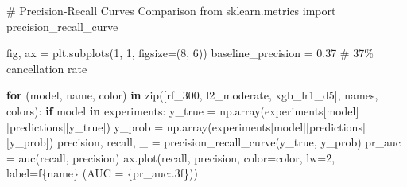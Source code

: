 \documentclass[
  letterpaper,
  DIV=11,
  numbers=noendperiod]{scrartcl}
\newenvironment{Shaded}{\begin{snugshade}}{\end{snugshade}}
\newcommand{\BuiltInTok}[1]{\textcolor[rgb]{0.00,0.23,0.31}{#1}}
\newcommand{\CommentTok}[1]{\textcolor[rgb]{0.37,0.37,0.37}{#1}}
\newcommand{\ControlFlowTok}[1]{\textcolor[rgb]{0.00,0.23,0.31}{\textbf{#1}}}
\newcommand{\DecValTok}[1]{\textcolor[rgb]{0.68,0.00,0.00}{#1}}
\newcommand{\FloatTok}[1]{\textcolor[rgb]{0.68,0.00,0.00}{#1}}
\newcommand{\ImportTok}[1]{\textcolor[rgb]{0.00,0.46,0.62}{#1}}
\newcommand{\KeywordTok}[1]{\textcolor[rgb]{0.00,0.23,0.31}{\textbf{#1}}}
\newcommand{\NormalTok}[1]{\textcolor[rgb]{0.00,0.23,0.31}{#1}}
\newcommand{\OperatorTok}[1]{\textcolor[rgb]{0.37,0.37,0.37}{#1}}
\newcommand{\SpecialCharTok}[1]{\textcolor[rgb]{0.37,0.37,0.37}{#1}}
\newcommand{\SpecialStringTok}[1]{\textcolor[rgb]{0.13,0.47,0.30}{#1}}
\newcommand{\StringTok}[1]{\textcolor[rgb]{0.13,0.47,0.30}{#1}}
\renewenvironment{Shaded}{%
  \begin{tcolorbox}[%
    enhanced,%
    colback=codebg,%
    colframe=codebg,%
    borderline west={3pt}{0pt}{sectionblue},%
    fontupper=\small\ttfamily,%
    boxrule=0pt,%
    arc=0pt,%
    boxsep=5pt,%
    left=2mm,%
    right=2mm,%
    top=2mm,%
    bottom=2mm%
  ]%
}{%
  \end{tcolorbox}%
}
\begin{document}
\begin{Shaded}
\begin{Highlighting}[]
\CommentTok{\# Precision{-}Recall Curves Comparison}
\ImportTok{from}\NormalTok{ sklearn.metrics }\ImportTok{import}\NormalTok{ precision\_recall\_curve}

\NormalTok{fig, ax }\OperatorTok{=}\NormalTok{ plt.subplots(}\DecValTok{1}\NormalTok{, }\DecValTok{1}\NormalTok{, figsize}\OperatorTok{=}\NormalTok{(}\DecValTok{8}\NormalTok{, }\DecValTok{6}\NormalTok{))}
\NormalTok{baseline\_precision }\OperatorTok{=} \FloatTok{0.37}  \CommentTok{\# 37\% cancellation rate}

\ControlFlowTok{for}\NormalTok{ (model, name, color) }\KeywordTok{in} \BuiltInTok{zip}\NormalTok{([}\StringTok{\textquotesingle{}rf\_300\textquotesingle{}}\NormalTok{, }\StringTok{\textquotesingle{}l2\_moderate\textquotesingle{}}\NormalTok{, }\StringTok{\textquotesingle{}xgb\_lr1\_d5\textquotesingle{}}\NormalTok{], names, colors):}
    \ControlFlowTok{if}\NormalTok{ model }\KeywordTok{in}\NormalTok{ experiments:}
\NormalTok{        y\_true }\OperatorTok{=}\NormalTok{ np.array(experiments[model][}\StringTok{\textquotesingle{}predictions\textquotesingle{}}\NormalTok{][}\StringTok{\textquotesingle{}y\_true\textquotesingle{}}\NormalTok{])}
\NormalTok{        y\_prob }\OperatorTok{=}\NormalTok{ np.array(experiments[model][}\StringTok{\textquotesingle{}predictions\textquotesingle{}}\NormalTok{][}\StringTok{\textquotesingle{}y\_prob\textquotesingle{}}\NormalTok{])}
\NormalTok{        precision, recall, \_ }\OperatorTok{=}\NormalTok{ precision\_recall\_curve(y\_true, y\_prob)}
\NormalTok{        pr\_auc }\OperatorTok{=}\NormalTok{ auc(recall, precision)}
\NormalTok{        ax.plot(recall, precision, color}\OperatorTok{=}\NormalTok{color, lw}\OperatorTok{=}\DecValTok{2}\NormalTok{, label}\OperatorTok{=}\SpecialStringTok{f\textquotesingle{}}\SpecialCharTok{\{}\NormalTok{name}\SpecialCharTok{\}}\SpecialStringTok{ (AUC = }\SpecialCharTok{\{}\NormalTok{pr\_auc}\SpecialCharTok{:.3f\}}\SpecialStringTok{)\textquotesingle{}}\NormalTok{)}


\end{Highlighting}
\end{Shaded}
\end{document}
